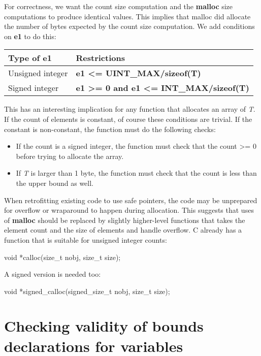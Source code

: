 \documentclass[]{article}
\begin{document}
For correctness, we want the count size computation and the
\textbf{malloc} size computations to produce identical values. This
implies that malloc did allocate the number of bytes expected by the
count size computation. We add conditions on \textbf{e1} to do this:

\begin{longtable}[c]{@{}ll@{}}
\toprule
Type of e1 & Restrictions\tabularnewline
\midrule
\endhead
Unsigned integer & \textbf{e1 \textless{}=
UINT\_MAX/sizeof(T)}\tabularnewline
Signed integer & \textbf{e1 \textgreater{}= 0 and e1 \textless{}=
INT\_MAX/sizeof(T)}\tabularnewline
\bottomrule
\end{longtable}

This has an interesting implication for any function that allocates an
array of \emph{T}. If the count of elements is constant, of course these
conditions are trivial. If the constant is non-constant, the function
must do the following checks:

\begin{itemize}
\item
  If the count is a signed integer, the function must check that the
  count \textgreater{}= 0 before trying to allocate the array.
\item
  If \emph{T} is larger than 1 byte, the function must check that the
  count is less than the upper bound as well.
\end{itemize}

When retrofitting existing code to use safe pointers, the code may be
unprepared for overflow or wraparound to happen during allocation. This
suggests that uses of \textbf{malloc} should be replaced by slightly
higher-level functions that takes the element count and the size of
elements and handle overflow. C already has a function that is suitable
for unsigned integer counts:

void *calloc(size\_t nobj, size\_t size);

A signed version is needed too:

void *signed\_calloc(signed\_size\_t nobj, size\_t size);

\section{\texorpdfstring{\protect\hypertarget{ux5fRef416355010}{}{\protect\hypertarget{ux5fToc420589181}{}{\protect\hypertarget{ux5fToc422906972}{}{\protect\hypertarget{ux5fToc424307696}{}{\protect\hypertarget{ux5fToc426641081}{}{\protect\hypertarget{ux5fRef426707778}{}{\protect\hypertarget{ux5fToc435434946}{}{\protect\hypertarget{ux5fToc437460772}{}{\protect\hypertarget{ux5fToc438466350}{}{\protect\hypertarget{ux5fToc440445451}{}{\protect\hypertarget{ux5fToc440449233}{}{\protect\hypertarget{ux5fToc440551883}{}{}}}}}}}}}}}}Checking
validity of bounds declarations for
variables}{Checking validity of bounds declarations for variables}}\label{checking-validity-of-bounds-declarations-for-variables}
\end{document}
